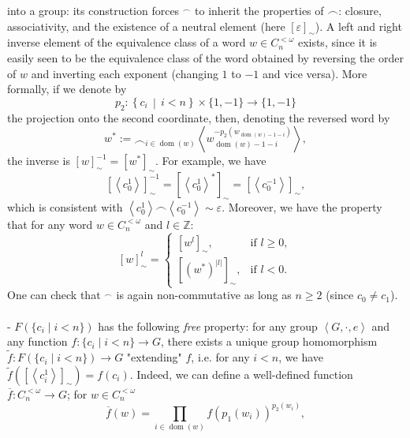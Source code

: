 \documentclass[11pt, a4paper, oneside]{article}
\theoremstyle{remark}
\theoremstyle{lemma}
\begin{document}
into a group: its construction forces \(^{\smallfrown}\) to inherit the properties of \(\frown\): closure, associativity, and the existence of a neutral element (here \(\left[\varepsilon\right]_{\sim}\)). A left and right inverse element of the equivalence class of a word \(w \in C_n^{<\omega}\) exists, since it is easily seen to be the equivalence class of the word obtained by reversing the order of \(w\) and inverting each exponent (changing \(1\) to \(-1\) and vice versa). More formally, if we denote by 
\[
p_2 : \left\{ c_i \,\middle|\, i < n \right\} \times \{1, -1\} \rightarrow \{1, -1\}
\] 
the projection onto the second coordinate, then, denoting the reversed word by
\[
w^{*} := \frown_{i \in \operatorname{dom}(w)} \left\langle w_{\operatorname{dom}(w)-1-i}^{-p_2\!\left(w_{\operatorname{dom}(w)-1-i}\right)} \right\rangle,
\] 
the inverse is \([w]_{\sim}^{-1} = \left[w^{*}\right]_{\sim}\).
For example, we have
\[
\left[\left\langle c_0^{1}\right\rangle\right]_{\sim}^{-1} = \left[\left\langle c_0^{1}\right\rangle^*\right]_{\sim}=\left[\left\langle c_0^{-1}\right\rangle\right]_{\sim},
\]
which is consistent with \(\left\langle c_0^{1}\right\rangle \frown \left\langle c_0^{-1}\right\rangle \sim \varepsilon\). Moreover, we have the property that for any word \(w\in C_n^{<\omega}\) and \(l \in \mathbb{Z}\):
\[
[w]_{\sim}^l =
\begin{cases}
\left[w^l\right]_{\sim}, & \text{if } l \geq 0,\\[2mm]
\left[(w^*)^{|l|}\right]_{\sim}, & \text{if } l < 0.
\end{cases}
\]
One can check that $^\smallfrown$ is again non-commutative as long as $n \geq 2$ (since $c_0 \neq c_1$).
\\\\
- $F(\{c_i \mid i<n\})$ has the following \emph{free} property:  
for any group $\left\langle G, \cdot, e \right\rangle$ and any function  
\(f : \{c_i \mid i<n\} \to G\), there exists a unique group homomorphism \(\tilde{f} : F(\{c_i \mid i<n\}) \to G\) "extending" \(f\), i.e. for any \(i<n\), we have \(\tilde{f}\left(\left[\left\langle c_i^{1} \right\rangle\right]_{\sim}\right) = f(c_i)\). Indeed, we can define a well-defined function  \(\overline{f} : C_n^{<\omega} \to G\); for \(w\in C_n^{<\omega}\)
\[
\overline{f}(w) = \prod_{i \in \operatorname{dom}(w)} f\!\left(p_1(w_i)\right)^{p_2(w_i)},
\]
\end{document}
